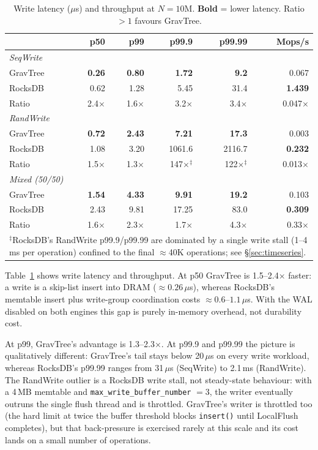 \documentclass[10pt,twocolumn]{article}
\begin{document}
\begin{table}[t]
\centering
\footnotesize
\caption{Write latency ($\mu$s) and throughput at $N = 10$M.
\textbf{Bold} = lower latency.  Ratio $>1$ favours GravTree.}
\label{tab:write}
\begin{tabular}{lrrrrr}
\toprule
 & p50 & p99 & p99.9 & p99.99 & Mops/s \\
\midrule
\multicolumn{6}{l}{\textit{SeqWrite}} \\
GravTree & \textbf{0.26} & \textbf{0.80} & \textbf{1.72} & \textbf{9.2} & 0.067 \\
RocksDB  & 0.62 & 1.28 & 5.45 & 31.4 & \textbf{1.439} \\
Ratio    & 2.4$\times$ & 1.6$\times$ & 3.2$\times$ & 3.4$\times$ & 0.047$\times$ \\
\midrule
\multicolumn{6}{l}{\textit{RandWrite}} \\
GravTree & \textbf{0.72} & \textbf{2.43} & \textbf{7.21} & \textbf{17.3} & 0.003 \\
RocksDB  & 1.08 & 3.20 & 1061.6 & 2116.7 & \textbf{0.232} \\
Ratio    & 1.5$\times$ & 1.3$\times$ & 147$\times$$^\ddagger$ & 122$\times$$^\ddagger$ & 0.013$\times$ \\
\midrule
\multicolumn{6}{l}{\textit{Mixed (50/50)}} \\
GravTree & \textbf{1.54} & \textbf{4.33} & \textbf{9.91} & \textbf{19.2} & 0.103 \\
RocksDB  & 2.43 & 9.81 & 17.25 & 83.0 & \textbf{0.309} \\
Ratio    & 1.6$\times$ & 2.3$\times$ & 1.7$\times$ & 4.3$\times$ & 0.33$\times$ \\
\bottomrule
\multicolumn{6}{p{0.95\linewidth}}{{\footnotesize $^\ddagger$RocksDB's RandWrite
p99.9/p99.99 are dominated by a single write stall (1--4\,ms per operation)
confined to the final $\approx$40K operations; see \S\ref{sec:timeseries}.}}
\end{tabular}
\end{table}

Table~\ref{tab:write} shows write latency and throughput.  At p50 GravTree is
1.5--2.4$\times$ faster: a write is a skip-list insert into DRAM
($\approx 0.26\,\mu$s), whereas RocksDB's memtable insert plus write-group
coordination costs $\approx 0.6$--$1.1\,\mu$s.  With the WAL disabled on both
engines this gap is purely in-memory overhead, not durability cost.

At p99, GravTree's advantage is 1.3--2.3$\times$.  At p99.9 and p99.99 the
picture is qualitatively different: GravTree's tail stays below 20\,$\mu$s on
every write workload, whereas RocksDB's p99.99 ranges from 31\,$\mu$s
(SeqWrite) to 2.1\,ms (RandWrite).  The RandWrite outlier is a RocksDB write
stall, not steady-state behaviour: with a 4\,MB memtable and
\texttt{max\_write\_buffer\_number} $= 3$, the writer eventually outruns the
single flush thread and is throttled.  GravTree's writer is throttled too
(the hard limit at twice the buffer threshold blocks \texttt{insert()} until LocalFlush completes),
but that back-pressure is exercised rarely at this scale and its cost lands
on a small number of operations.
\end{document}
